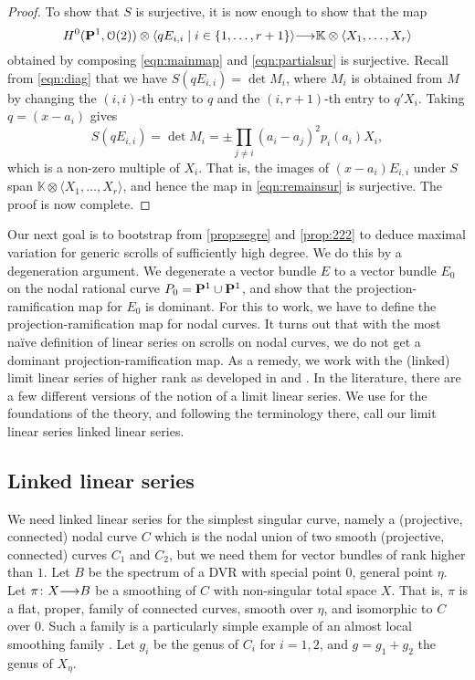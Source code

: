 \documentclass[11pt,reqno]{amsart}
\theoremstyle{plain}
\theoremstyle{definition}
\theoremstyle{remark}
\numberwithin{equation}{section}
\renewcommand{\k}{\mathbb{K}}
\renewcommand{\to}{{\longrightarrow}}
\numberwithin{equation}{section}
\renewcommand{\O}{\mathcal O}
\begin{document}
\begin{proof}
  To show that $S$ is surjective, it is now enough to show that the map
  \begin{equation}\label{eqn:remainsur}
    H^0(\P^1, \O(2)) \otimes \langle  qE_{i,i} \mid i \in \{1, \dots, r+1\} \rangle \to \k \otimes \langle  X_1, \dots, X_r \rangle
  \end{equation}
  obtained by composing \eqref{eqn:mainmap} and \eqref{eqn:partialsur} is surjective.
  Recall from \eqref{eqn:diag} that we have $S(qE_{i,i}) = \det M_i$, where $M_i$ is obtained from $M$ by changing the $(i,i)$-th entry to $q$ and the $(i, r+1)$-th entry to $q'X_i$.
  Taking $q = (x-a_i)$ gives
  \[ S(qE_{i,i}) = \det M_i = \pm \prod_{j \neq i} (a_i-a_j)^2 p_i(a_i) X_i,\]
  which is a non-zero multiple of $X_i$.
  That is, the images of $(x-a_i)E_{i,i}$ under $S$ span $\k \otimes \langle  X_1, \dots, X_r \rangle$, and hence the map in \eqref{eqn:remainsur} is surjective.
  The proof is now complete.
\end{proof}

Our next goal is to bootstrap from \autoref{prop:segre} and \autoref{prop:222} to deduce maximal variation for generic scrolls of sufficiently high degree.
We do this by a degeneration argument.
We degenerate a vector bundle $E$ to a vector bundle $E_0$ on the nodal rational curve $P_0 = \P^1 \cup \P^1$, and show that the projection-ramification map for $E_0$ is dominant.
For this to work, we have to define the projection-ramification map for nodal curves.
It turns out that with the most na\"ive definition of linear series on scrolls on nodal curves, we do not get a dominant projection-ramification map.
As a remedy, we work with the (linked) limit linear series of higher rank as developed in \cite{tei-i-big:91} and \cite{oss:14}.
In the literature, there are a few different versions of the notion of a limit linear series.
We use \cite{oss:14} for the foundations of the theory, and following the terminology there, call our limit linear series linked linear series.

\subsection{Linked linear series}\label{sec:lls}
We need linked linear series for the simplest singular curve, namely a (projective, connected) nodal curve $C$ which is the nodal union of two smooth (projective, connected) curves $C_1$ and $C_2$, but we need them for vector bundles of rank higher than $1$.
Let $B$ be the spectrum of a DVR with special point $0$, general point $\eta$.
Let $\pi \from X \to B$ be a smoothing of $C$ with non-singular total space $X$.
That is, $\pi$ is a flat, proper, family of connected curves, smooth over $\eta$, and isomorphic to $C$ over $0$.
Such a family is a particularly simple example of an almost local smoothing family \cite[\S~2.1--2.2]{oss:14}.
Let $g_i$ be the genus of $C_i$ for $i = 1, 2$, and $g = g_1+g_2$ the genus of $X_\eta$.
\end{document}
